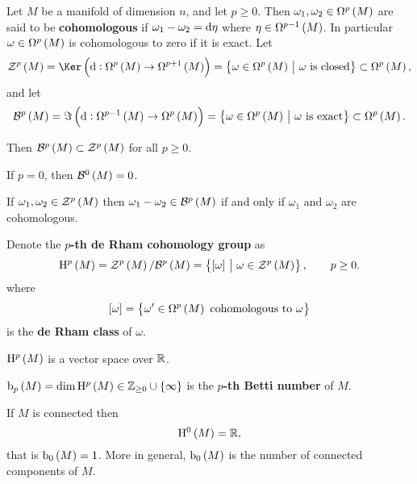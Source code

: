 \begin{definition}
Let $ M $ be a manifold of dimension $ n $, and let $ p \ge 0 $. Then $ \omega_1, \omega_2 \in \Omega^p\br{M} $ are said to be \textbf{cohomologous} if $ \omega_1 - \omega_2 = \mathrm{d}\eta $ where $ \eta \in \Omega^{p - 1}\br{M} $. In particular $ \omega \in \Omega^p\br{M} $ is cohomologous to zero if it is exact. Let
$$ \ZZZ^p\br{M} = \Ker \br{\d : \Omega^p\br{M} \to \Omega^{p + 1}\br{M}} = \cbr{\omega \in \Omega^p\br{M} \st \omega \ \text{is closed}} \subset \Omega^p\br{M}, $$
and let
$$ \BBB^p\br{M} = \Im \br{\d : \Omega^{p - 1}\br{M} \to \Omega^p\br{M}} = \cbr{\omega \in \Omega^p\br{M} \st \omega \ \text{is exact}} \subset \Omega^p\br{M}. $$
\end{definition}

Then $ \BBB^p\br{M} \subset \ZZZ^p\br{M} $ for all $ p \ge 0 $.

\begin{notation*}
If $ p = 0 $, then $ \BBB^0\br{M} = 0 $.
\end{notation*}

\begin{note*}
If $ \omega_1, \omega_2 \in \ZZZ^p\br{M} $ then $ \omega_1 - \omega_2 \in \BBB^p\br{M} $ if and only if $ \omega_1 $ and $ \omega_2 $ are cohomologous.
\end{note*}

\begin{definition}
Denote the \textbf{$ p $-th de Rham cohomology group} as
$$ \H^p\br{M} = \ZZZ^p\br{M} / \BBB^p\br{M} = \cbr{\sbr{\omega} \st \omega \in \ZZZ^p\br{M}}, \qquad p \ge 0. $$
where
$$ \sbr{\omega} = \cbr{\omega' \in \Omega^p\br{M} \ \text{cohomologous to} \ \omega} $$
is the \textbf{de Rham class} of $ \omega $.
\end{definition}

\begin{remark*}
$ \H^p\br{M} $ is a vector space over $ \mathbb{R} $.
\end{remark*}

\begin{definition}
$ \b_p\br{M} = \dim \H^p\br{M} \in \ZZ_{\ge 0} \cup \cbr{\infty} $ is the \textbf{$ p $-th Betti number} of $ M $.
\end{definition}

\begin{proposition}
If $ M $ is connected then
$$ \H^0\br{M} = \RR, $$
that is $ \b_0\br{M} = 1 $. More in general, $ \b_0\br{M} $ is the number of connected components of $ M $.
\end{proposition}

